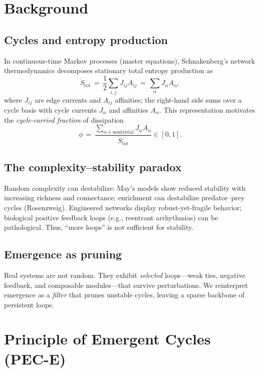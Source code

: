 \documentclass[11pt,a4paper]{article}
\newcommand{\dotS}{\dot S_{\mathrm{tot}}}
\newcommand{\phifrac}{\phi}
\begin{document}
\section{Background}
\subsection{Cycles and entropy production}
In continuous-time Markov processes (master equations), Schnakenberg's network thermodynamics decomposes stationary total entropy production as
\begin{equation}
\dotS \,=\, \frac{1}{2}\sum_{i,j} J_{ij} A_{ij} \,=\, \sum_{\alpha} J_{\alpha} A_{\alpha},
\end{equation}
where $J_{ij}$ are edge currents and $A_{ij}$ affinities; the right-hand side sums over a cycle basis with cycle currents $J_{\alpha}$ and affinities $A_{\alpha}$. This representation motivates the \emph{cycle-carried fraction} of dissipation
\begin{equation}
\phifrac \,=\, \frac{\sum_{\alpha\in \text{nontrivial}} J_{\alpha}A_{\alpha}}{\dotS} \in [0,1].
\end{equation}

\subsection{The complexity--stability paradox}
Random complexity can destabilize: May's models show reduced stability with increasing richness and connectance; enrichment can destabilize predator--prey cycles (Rosenzweig). Engineered networks display robust-yet-fragile behavior; biological positive feedback loops (e.g., reentrant arrhythmias) can be pathological. Thus, ``more loops'' is not sufficient for stability.

\subsection{Emergence as pruning}
Real systems are not random. They exhibit \emph{selected} loops---weak ties, negative feedback, and composable modules---that survive perturbations. We reinterpret emergence as a \emph{filter} that prunes unstable cycles, leaving a sparse backbone of persistent loops.

\section{Principle of Emergent Cycles (PEC-E)}
\end{document}
